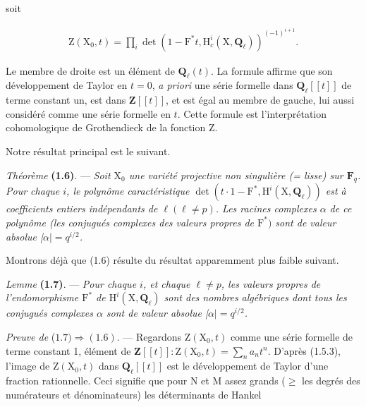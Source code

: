 \documentclass[10pt,leqno]{article}
\begin{document}
\noindent soit\par

\begin{equation*}\begin{gathered}\mathrm{Z}(\mathrm{X}_{0},t) = \prod _{i} \operatorname{det}(1- \mathrm{F}^{*}t, \mathrm{H}_{c}^{i}(\mathrm{X},\mathbf{Q}_{\ell }))^{(- 1)^{i+1}}.\end{gathered}\tag{1.5.4}\end{equation*}

\noindent Le membre de droite est un élément de \(\mathbf{Q}_{\ell }(t)\). La formule affirme que son développement de Taylor en \(t=0\), \emph{a priori} une série formelle dans \(\mathbf{Q}_{\ell }[[t]]\) de terme constant un, est dans \(\mathbf{Z}[[t]]\), et est égal au membre de gauche, lui aussi considéré comme une série formelle en \(t\). Cette formule est l’interprétation cohomologique de Grothendieck de la fonction \(\mathrm{Z}\).\par

\noindent Notre résultat principal est le suivant.\par

\noindent \emph{Théorème} \textbf{(1.6)}. — {\itshape Soit \(\mathrm{X}_{0}\) une variété projective non singulière (= lisse) sur \(\mathbf{F}_{q}\). Pour chaque \(i\), le polynôme caractéristique \(\operatorname{det}(t\cdot 1- \mathrm{F}^{*}, \mathrm{H}^{i}(\mathrm{X},\mathbf{Q}_{\ell }))\) est à coefficients entiers indépendants de \(\ell  (\ell \ne p)\). Les racines complexes \(\alpha \) de ce polynôme (les conjugués complexes des valeurs propres de \(\mathrm{F}^{*})\) sont de valeur absolue |\(\alpha |=q^{i/2}\).}\par

\noindent Montrons déjà que (1.6) résulte du résultat apparemment plus faible suivant.\par

\noindent \emph{Lemme} \textbf{(1.7)}. — {\itshape Pour chaque \(i\), et chaque \(\ell \ne p\), les valeurs propres de l’endomorphisme \(\mathrm{F}^{*}\) de \(\mathrm{H}^{i}(\mathrm{X},\mathbf{Q}_{\ell })\) sont des nombres algébriques dont tous les conjugués complexes \(\alpha \) sont de valeur absolue |\(\alpha |=q^{i/2}\).}\par

\noindent \emph{Preuve de} (\(1.7) \Rightarrow  (1.6)\). — Regardons \(\mathrm{Z}(\mathrm{X}_{0},t)\) comme une série formelle de terme constant 1, élément de \(\mathbf{Z}[[t]] : \mathrm{Z}(\mathrm{X}_{0},t)=\sum _{n} a_{n} t^{n}\). D’après (1.5.3), l’image de \(\mathrm{Z}(\mathrm{X}_{0},t)\) dans \(\mathbf{Q}_{\ell }[[t]]\) est le développement de Taylor d’une fraction rationnelle. Ceci signifie que pour \(\mathrm{N}\) et \(\mathrm{M}\) assez grands (\(\geq \) les degrés des numérateurs et dénominateurs) les déterminants de Hankel\par
\end{document}
